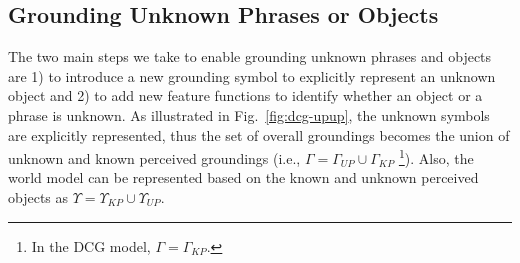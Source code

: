 \subsection{Grounding Unknown Phrases or Objects}




The two main steps we take to enable grounding unknown phrases and objects are 1) to introduce a new grounding symbol to explicitly represent an unknown object and 2) to add new feature functions to identify whether an object or a phrase is unknown. As illustrated in Fig.~\ref{fig:dcg-upup}, the unknown symbols are explicitly represented, thus the set of overall groundings becomes the union of unknown and known perceived groundings (i.e., $\Gamma = \Gamma_{UP} \cup \Gamma_{KP}$ \footnote{In the DCG model, $\Gamma = \Gamma_{KP}$.}). Also, the world model can be represented based on the known and unknown perceived objects as $\Upsilon = \Upsilon_{KP} \cup \Upsilon_{UP}$. 

